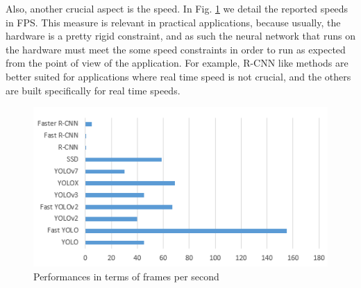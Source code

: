 Also, another crucial aspect is the speed. In Fig. \ref{fps} we detail the reported speeds in FPS. This measure is relevant in practical applications, because usually, the hardware is a pretty rigid constraint, and as such the neural network that runs on the hardware must meet the some speed constraints in order to run as expected from the point of view of the application. For example, R-CNN like methods are better suited for applications where real time speed is not crucial, and the others are built specifically for real time speeds.

\begin{figure}[!h]
  \centering
  \includegraphics[scale=\scalevar]{images/speed.png}
  \caption{Performances in terms of frames per second}
  \label{fps}
\end{figure}





        


    

